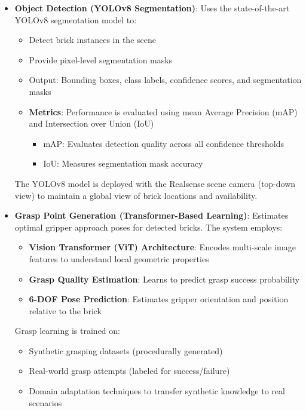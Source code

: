 \begin{itemize}
    \item \textbf{Object Detection (YOLOv8 Segmentation)}: Uses the state-of-the-art YOLOv8 segmentation model to:
    \begin{itemize}
        \item Detect brick instances in the scene
        \item Provide pixel-level segmentation masks
        \item Output: Bounding boxes, class labels, confidence scores, and segmentation masks
        
        \item \textbf{Metrics}: Performance is evaluated using mean Average Precision (mAP) and Intersection over Union (IoU)
        \begin{itemize}
            \item mAP: Evaluates detection quality across all confidence thresholds
            \item IoU: Measures segmentation mask accuracy
        \end{itemize}
    \end{itemize}
    
    The YOLOv8 model is deployed with the Realsense scene camera (top-down view) to maintain a global view of brick locations and availability.
    
    \item \textbf{Grasp Point Generation (Transformer-Based Learning)}: Estimates optimal gripper approach poses for detected bricks. The system employs:
    \begin{itemize}
        \item \textbf{Vision Transformer (ViT) Architecture}: Encodes multi-scale image features to understand local geometric properties
        \item \textbf{Grasp Quality Estimation}: Learns to predict grasp success probability
        \item \textbf{6-DOF Pose Prediction}: Estimates gripper orientation and position relative to the brick
    \end{itemize}
    
    Grasp learning is trained on:
    \begin{itemize}
        \item Synthetic grasping datasets (procedurally generated)
        \item Real-world grasp attempts (labeled for success/failure)
        \item Domain adaptation techniques to transfer synthetic knowledge to real scenarios
    \end{itemize}
    

\end{itemize}
